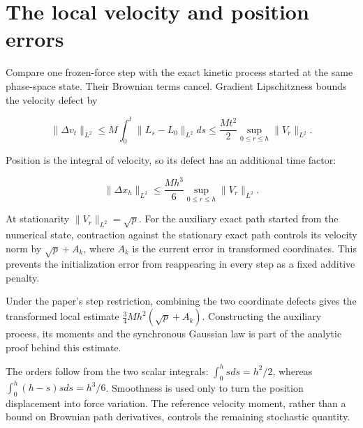 \documentclass[11pt,a4paper]{article}
\begin{document}
\section{\texorpdfstring{The local velocity and position errors}{The local velocity and position errors}}


Compare one frozen-force step with the exact kinetic process started at
the same phase-space state. Their Brownian terms cancel. Gradient Lipschitzness
bounds the velocity defect by


\[\|\Delta v_t\|_{L^2}
\le M\int_0^t\|L_s-L_0\|_{L^2}ds
\le\frac{Mt^2}{2}\sup_{0\le r\le h}\|V_r\|_{L^2}.\]


Position is the integral of velocity, so its defect has an additional time
factor:


\[\|\Delta x_h\|_{L^2}\le\frac{Mh^3}{6}
\sup_{0\le r\le h}\|V_r\|_{L^2}.\]


At stationarity \(\|V_r\|_{L^2}=\sqrt p\). For the auxiliary exact path
started from the numerical state, contraction against the stationary exact
path controls its velocity norm by \(\sqrt p+A_k\), where \(A_k\) is the
current error in transformed coordinates. This prevents the initialization
error from reappearing in every step as a fixed additive penalty.




Under the paper's step restriction, combining the two coordinate defects
gives the transformed local estimate
\(\tfrac34Mh^2(\sqrt p+A_k)\). Constructing the auxiliary process, its
moments and the synchronous Gaussian law is part of the analytic proof behind
this estimate.



The orders follow from the two scalar integrals: \(\int_0^hsds=h^2/2\), whereas \(\int_0^h(h-s)sds=h^3/6\). Smoothness is used only to turn the position displacement into force variation. The reference velocity moment, rather than a bound on Brownian path derivatives, controls the remaining stochastic quantity.
\end{document}
